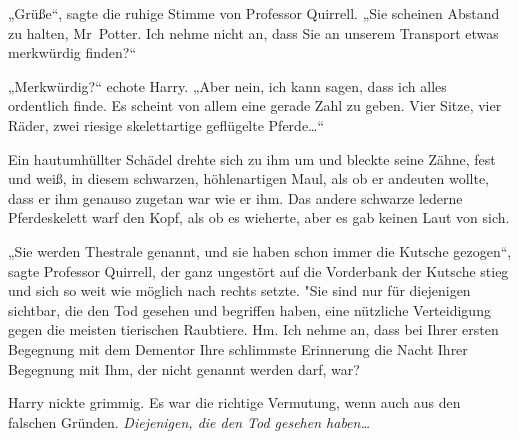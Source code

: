 „Grüße“, sagte die ruhige Stimme von Professor Quirrell. „Sie scheinen Abstand zu halten, Mr~Potter. Ich nehme nicht an, dass Sie an unserem Transport etwas merkwürdig finden?“

„Merkwürdig?“ echote Harry. „Aber nein, ich kann sagen, dass ich alles ordentlich finde. Es scheint von allem eine gerade Zahl zu geben. Vier Sitze, vier Räder, zwei riesige skelettartige geflügelte Pferde…“

Ein hautumhüllter Schädel drehte sich zu ihm um und bleckte seine Zähne, fest und weiß, in diesem schwarzen, höhlenartigen Maul, als ob er andeuten wollte, dass er ihm genauso zugetan war wie er ihm. Das andere schwarze lederne Pferdeskelett warf den Kopf, als ob es wieherte, aber es gab keinen Laut von sich.

„Sie werden Thestrale genannt, und sie haben schon immer die Kutsche gezogen“, sagte Professor Quirrell, der ganz ungestört auf die Vorderbank der Kutsche stieg und sich so weit wie möglich nach rechts setzte. "Sie sind nur für diejenigen sichtbar, die den Tod gesehen und begriffen haben, eine nützliche Verteidigung gegen die meisten tierischen Raubtiere. Hm. Ich nehme an, dass bei Ihrer ersten Begegnung mit dem Dementor Ihre schlimmste Erinnerung die Nacht Ihrer Begegnung mit Ihm, der nicht genannt werden darf, war?

Harry nickte grimmig. Es war die richtige Vermutung, wenn auch aus den falschen Gründen. \emph{Diejenigen, die den Tod gesehen haben…}


